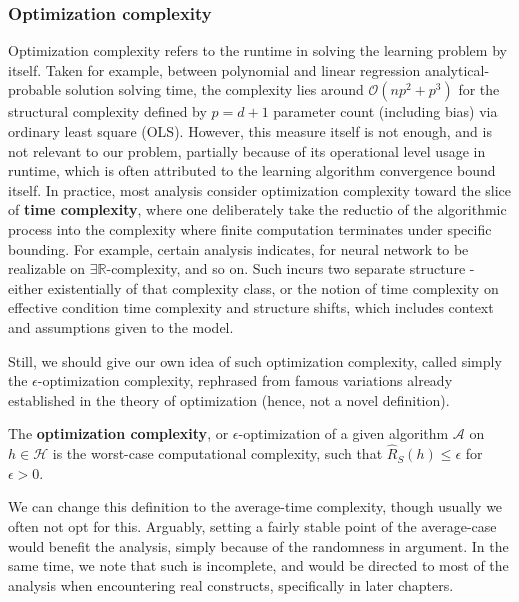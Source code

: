 \subsubsection{Optimization complexity}

Optimization complexity refers to the runtime in solving the learning problem by itself. Taken for example, between polynomial and linear regression analytical-probable solution solving time, the complexity lies around $\mathcal{O}(np^{2}+p^{3})$ for the structural complexity defined by $p=d+1$ parameter count (including bias) via ordinary least square (OLS). However, this measure itself is not enough, and is not relevant to our problem, partially because of its operational level usage in runtime, which is often attributed to the learning algorithm convergence bound itself. In practice, most analysis consider optimization complexity toward the slice of \textbf{time complexity}, where one deliberately take the reductio of the algorithmic process into the complexity where finite computation terminates under specific bounding. For example, certain analysis indicates, \cite{abrahamsen2021existential} for neural network to be realizable on $\exists \mathbb{R}$-complexity, and so on. Such incurs two separate structure - either existentially of that complexity class, or the notion of time complexity on effective condition time complexity and structure shifts, which includes context and assumptions given to the model. 

Still, we should give our own idea of such optimization complexity, called simply the $\epsilon$-optimization complexity, rephrased from famous variations already established in the theory of optimization (hence, not a novel definition). 

\begin{definition}
  The \textbf{optimization complexity}, or $\epsilon$-optimization of a given algorithm $\mathcal{A}$ on $h\in \mathcal{H}$ is the worst-case computational complexity, such that $\hat{R}_{S}(h)\leq \epsilon$ for $\epsilon >0$. 
\end{definition}

We can change this definition to the average-time complexity, though usually we often not opt for this. Arguably, setting a fairly stable point of the average-case would benefit the analysis, simply because of the randomness in argument. In the same time, we note that such is incomplete, and would be directed to most of the analysis when encountering real constructs, specifically in later chapters. 

